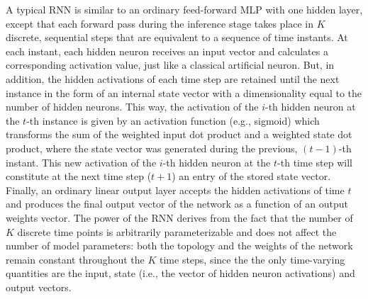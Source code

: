 \documentclass[preprint,review,12pt]{elsarticle}
\begin{document}
A typical RNN is similar to an ordinary feed-forward MLP with one hidden layer, except that each forward pass during the inference stage takes place in $K$ discrete, sequential steps that are equivalent to a sequence of time instants. At each instant, each hidden neuron receives an input vector and calculates a corresponding activation value, just like a classical artificial neuron. But, in addition, the hidden activations of each time step are retained until the next instance in the form of an internal state vector with a dimensionality equal to the number of hidden neurons. This way, the activation of the $i$-th hidden neuron at the $t$-th instance is given by an activation function (e.g., sigmoid) which transforms the sum of the weighted input dot product and a weighted state dot product, where the state vector was generated during the previous, $(t-1)$-th instant. This new activation of the $i$-th hidden neuron at the $t$-th time step will constitute at the next time step ($t+1$) an entry of the stored state vector. Finally, an ordinary linear output layer accepts the hidden activations of time $t$ and produces the final output vector of the network as a function of an output weights vector. The power of the RNN derives from the fact that the number of $K$ discrete time points is arbitrarily parameterizable and does not affect the number of model parameters: both the topology and the weights of the network remain constant throughout the $K$ time steps, since the the only time-varying quantities are the input, state (i.e., the vector of hidden neuron activations) and output vectors.
\end{document}
